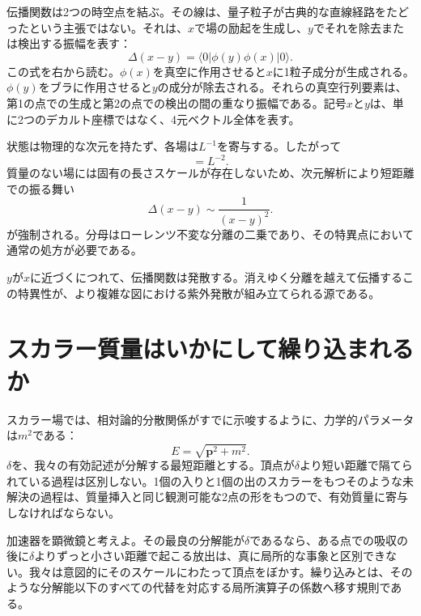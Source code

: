 伝播関数は2つの時空点を結ぶ。その線は、量子粒子が古典的な直線経路をたどったという主張ではない。それは、\(x\)で場の励起を生成し、\(y\)でそれを除去または検出する振幅を表す：
\begin{equation}
\Delta(x-y)=\langle0|\phi(y)\phi(x)|0\rangle.
\label{eq:position-propagator}
\end{equation}
この式を右から読む。\(\phi(x)\)を真空に作用させると\(x\)に1粒子成分が生成される。\(\phi(y)\)をブラに作用させると\(y\)の成分が除去される。それらの真空行列要素は、第1の点での生成と第2の点での検出の間の重なり振幅である。記号\(x\)と\(y\)は、単に2つのデカルト座標ではなく、4元ベクトル全体を表す。

状態は物理的な次元を持たず、各場は\(L^{-1}\)を寄与する。したがって
\begin{equation}
[\Delta]=L^{-2}.
\end{equation}
質量のない場には固有の長さスケールが存在しないため、次元解析により短距離での振る舞い
\begin{equation}
\Delta(x-y)\sim\frac{1}{(x-y)^2}.
\label{eq:massless-propagator}
\end{equation}
が強制される。分母はローレンツ不変な分離の二乗であり、その特異点において通常の処方が必要である。

\(y\)が\(x\)に近づくにつれて、伝播関数は発散する。消えゆく分離を越えて伝播するこの特異性が、より複雑な図における紫外発散が組み立てられる源である。

\section{スカラー質量はいかにして繰り込まれるか}

スカラー場では、相対論的分散関係がすでに示唆するように、力学的パラメータは\(m^2\)である：
\begin{equation}
E=\sqrt{\mathbf p^2+m^2}.
\end{equation}
\(\delta\)を、我々の有効記述が分解する最短距離とする。頂点が\(\delta\)より短い距離で隔てられている過程は区別しない。1個の入りと1個の出のスカラーをもつそのような未解決の過程は、質量挿入と同じ観測可能な2点の形をもつので、有効質量に寄与しなければならない。

加速器を顕微鏡と考えよ。その最良の分解能が\(\delta\)であるなら、ある点での吸収の後に\(\delta\)よりずっと小さい距離で起こる放出は、真に局所的な事象と区別できない。我々は意図的にそのスケールにわたって頂点をぼかす。繰り込みとは、そのような分解能以下のすべての代替を対応する局所演算子の係数へ移す規則である。


